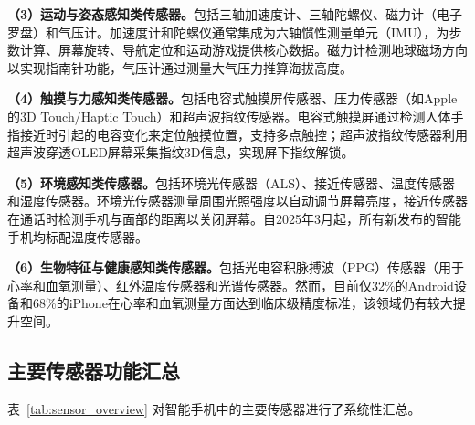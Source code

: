 \documentclass[12pt, a4paper]{ctexart}
\begin{document}
\textbf{（3）运动与姿态感知类传感器。}包括三轴加速度计、三轴陀螺仪、磁力计（电子罗盘）和气压计。加速度计和陀螺仪通常集成为六轴惯性测量单元（IMU），为步数计算、屏幕旋转、导航定位和运动游戏提供核心数据。磁力计检测地球磁场方向以实现指南针功能，气压计通过测量大气压力推算海拔高度。

\textbf{（4）触摸与力感知类传感器。}包括电容式触摸屏传感器、压力传感器（如Apple的3D Touch/Haptic Touch）和超声波指纹传感器。电容式触摸屏通过检测人体手指接近时引起的电容变化来定位触摸位置，支持多点触控；超声波指纹传感器利用超声波穿透OLED屏幕采集指纹3D信息，实现屏下指纹解锁\cite{adenekan2024}。

\textbf{（5）环境感知类传感器。}包括环境光传感器（ALS）、接近传感器、温度传感器和湿度传感器。环境光传感器测量周围光照强度以自动调节屏幕亮度，接近传感器在通话时检测手机与面部的距离以关闭屏幕。自2025年3月起，所有新发布的智能手机均标配温度传感器\cite{alibaba2026}。

\textbf{（6）生物特征与健康感知类传感器。}包括光电容积脉搏波（PPG）传感器（用于心率和血氧测量）、红外温度传感器和光谱传感器\cite{allen2007}。然而，目前仅32\%的Android设备和68\%的iPhone在心率和血氧测量方面达到临床级精度标准\cite{alibaba2026}，该领域仍有较大提升空间。

\subsection{主要传感器功能汇总}

表~\ref{tab:sensor_overview} 对智能手机中的主要传感器进行了系统性汇总。
\end{document}
